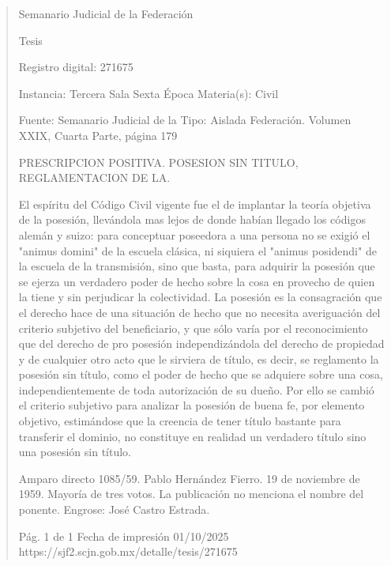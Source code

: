 \documentclass[11pt,a4paper]{article}
\begin{document}
\begin{quote}
                                                   Semanario Judicial de la Federación

                                                  Tesis

 Registro digital: 271675

 Instancia: Tercera Sala          Sexta Época                           Materia(s): Civil

                                  Fuente: Semanario Judicial de la   Tipo: Aislada
                                  Federación.
                                  Volumen XXIX, Cuarta Parte, página
                                  179


PRESCRIPCION POSITIVA. POSESION SIN TITULO, REGLAMENTACION DE LA.


El espíritu del Código Civil vigente fue el de implantar la teoría objetiva de la posesión, llevándola
mas lejos de donde habían llegado los códigos alemán y suizo: para conceptuar poseedora a una
persona no se exigió el "animus domini" de la escuela clásica, ni siquiera el "animus posidendi" de
la escuela de la transmisión, sino que basta, para adquirir la posesión que se ejerza un verdadero
poder de hecho sobre la cosa en provecho de quien la tiene y sin perjudicar la colectividad. La
posesión es la consagración que el derecho hace de una situación de hecho que no necesita
averiguación del criterio subjetivo del beneficiario, y que sólo varía por el reconocimiento que del
derecho de pro posesión independizándola del derecho de propiedad y de cualquier otro acto que le
sirviera de título, es decir, se reglamento la posesión sin título, como el poder de hecho que se
adquiere sobre una cosa, independientemente de toda autorización de su dueño. Por ello se cambió
el criterio subjetivo para analizar la posesión de buena fe, por elemento objetivo, estimándose que la
creencia de tener título bastante para transferir el dominio, no constituye en realidad un verdadero
título sino una posesión sin título.


Amparo directo 1085/59. Pablo Hernández Fierro. 19 de noviembre de 1959. Mayoría de tres votos.
La publicación no menciona el nombre del ponente. Engrose: José Castro Estrada.




                                             Pág. 1 de 1             Fecha de impresión 01/10/2025
  https://sjf2.scjn.gob.mx/detalle/tesis/271675

\end{quote}
\end{document}
